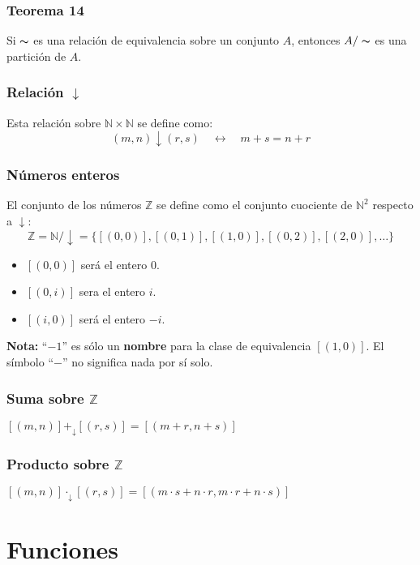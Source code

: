 \begin{multicols}{2}
    \subsubsection*{Teorema 14}
    Si $\thicksim$ es una relación de equivalencia sobre un conjunto $A$, entonces $A/\thicksim$ es una partición de $A$.
    
    \subsubsection*{Relación $\downarrow$} 
    Esta relación sobre $\mathbb{N} \times \mathbb{N}$ se define como:
    $$
    (m,n) \downarrow (r,s) \quad \leftrightarrow \quad m + s = n + r
    $$
    
    \subsubsection*{Números enteros}
    El conjunto de los números $\mathbb{Z}$ se define como el conjunto cuociente de $\mathbb{N}^2$ respecto a $\downarrow$:
    $$
    \mathbb{Z} = \mathbb{N}/\downarrow = \{[(0,0)],[(0,1)],[(1,0)], [(0,2)],[(2,0)],\ldots\}
    $$
    \begin{itemize}
        \item $[(0,0)]$ será el entero 0.
        \item $[(0,i)]$ sera el entero $i$.
        \item $[(i,0)]$ será el entero $-i$.
    \end{itemize}
    \textbf{Nota:} ``$-1$'' es sólo un \textbf{nombre} para la clase de equivalencia $[(1,0)]$. El símbolo ``$-$'' no significa nada por sí solo.
    
    \subsubsection*{Suma sobre $\mathbb{Z}$} 
    $[(m,n)] +_\downarrow [(r,s)] = [(m + r, n +s)]$
    
    \subsubsection*{Producto sobre $\mathbb{Z}$} $[(m,n)] \cdot_\downarrow [(r,s)] = [(m \cdot s + n \cdot r, m \cdot r + n \cdot s)]$
    
    \section{Funciones}
    

\end{multicols}
